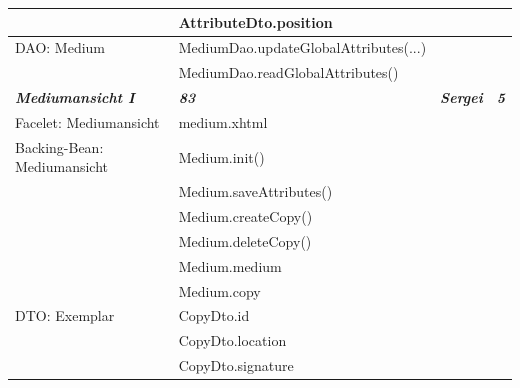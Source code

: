 \documentclass{article}
\begin{document}
\begin{longtable}{|l|l|l|l|}
\hline
                                        & AttributeDto.position                    &                             &                        \\ 
\hline
DAO: Medium                             & MediumDao.updateGlobalAttributes(...)    &                             &                        \\ 
\hline
                                        & MediumDao.readGlobalAttributes()         &                             &                        \\ 
\hline
\textbf{\textit{Mediumansicht I}}       & \textbf{\textit{83}}                     & \textbf{\textit{Sergei}}    & \textbf{\textit{5}}    \\ 
\hline
Facelet: Mediumansicht                  & medium.xhtml                             &                             &                        \\ 
\hline
Backing-Bean: Mediumansicht             & Medium.init()                            &                             &                        \\ 
\hline
                                        & Medium.saveAttributes()                  &                             &                        \\ 
\hline
                                        & Medium.createCopy()                      &                             &                        \\ 
\hline
                                        & Medium.deleteCopy()                      &                             &                        \\ 
\hline
                                        & Medium.medium                            &                             &                        \\ 
\hline
                                        & Medium.copy                              &                             &                        \\ 
\hline
DTO: Exemplar                           & CopyDto.id                               &                             &                        \\ 
\hline
                                        & CopyDto.location                         &                             &                        \\ 
\hline
                                        & CopyDto.signature                        &                             &                        \\ 

\end{longtable}
\end{document}
